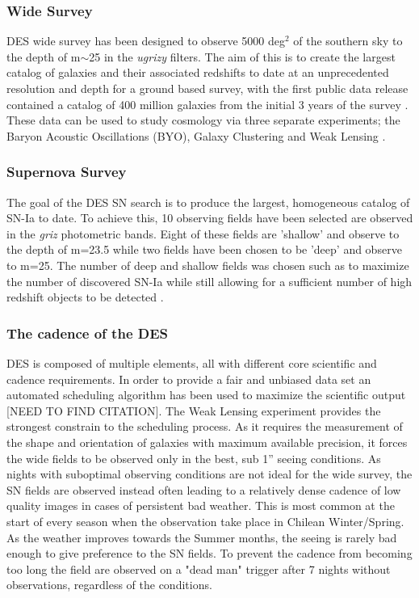 \subsubsection{Wide Survey}
DES wide survey has been designed to observe 5000 deg$^2$ of the southern sky to the depth of m$\sim$25 in the \textit{ugrizy} filters. The aim of this is to create the largest catalog of galaxies and their associated redshifts to date at an unprecedented resolution and depth for a ground based survey, with the first public data release contained a catalog of 400 million galaxies from the initial 3 years of the survey \citep{DES2018}. These data can be used to study cosmology via three separate experiments; the Baryon Acoustic Oscillations (BYO), Galaxy Clustering and Weak Lensing \citep{DES2016,Prat2017,Drlica-Wagner2017,DES2017}.

\subsubsection{Supernova Survey}
The goal of the DES SN search is to produce the largest, homogeneous catalog of SN-Ia to date. To achieve this, 10 observing fields have been selected are observed in the \textit{griz} photometric bands. Eight of these fields are 'shallow' and observe to the depth of m=23.5 while two fields have been chosen to be 'deep' and observe to m=25. The number of deep and shallow fields was chosen such as to maximize the number of discovered SN-Ia while still allowing for a sufficient number of high redshift objects to be detected \citep{Bernstein2012}.

\subsubsection{The cadence of the DES}
DES is composed of multiple elements, all with different core scientific and cadence requirements. In order to provide a fair and unbiased data set an automated scheduling algorithm has been used to maximize the scientific output [NEED TO FIND CITATION]. The Weak Lensing experiment provides the strongest constrain to the scheduling process. As it requires the measurement of the shape and orientation of galaxies with maximum available precision, it forces the wide fields to be observed only in the best, sub 1'' seeing conditions. As nights with suboptimal observing conditions are not ideal for the wide survey, the SN fields are observed instead often leading to a relatively dense cadence of low quality images in cases of persistent bad weather. This is most common at the start of every season when the observation take place in Chilean Winter/Spring. As the weather improves towards the Summer months, the seeing is rarely bad enough to give preference to the SN fields. To prevent the cadence from becoming too long the field are observed on a "dead man" trigger after 7 nights without observations, regardless of the conditions.

